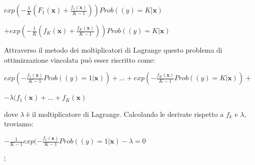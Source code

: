 \begin{center}
 \begin{math}
  exp(-\frac{1}{K}(F_1(\textbf{x}) + \frac{f_1(\textbf{x})}{K-1})) Prob ((y)=K|\textbf{x})
 \end{math}

\end{center}


\begin{center}
 \begin{math}
  + exp(-\frac{1}{K}(f_K(\textbf{x}) + \frac{f_K(\textbf{x})}{K-1})) Prob ((y)=K|\textbf{x})
 \end{math}

\end{center}


Attraverso il metodo dei moltiplicatori di Lagrange questo problema di ottimizzazione vincolata pu\`o 
esser riscritto come:
\begin{center}
 \begin{math}
  exp (-\frac{f_1(\textbf{x})}{K-1} Prob((y)=1|\textbf{x})) + \dots 
+ exp (-\frac{f_K(\textbf{x})}{K-1} Prob((y)=K|\textbf{x})) + 
 \end{math}
\end{center}
\begin{center}
 \begin{math}
-  \lambda (f_1(\textbf{x}) + \dots + f_K(\textbf{x})
 \end{math}

\end{center}
dove \begin{math}
      \lambda 
     \end{math}  \`e il moltiplicatore di Lagrange. Calcolando le derivate rispetto a 
\begin{math}
 f_k
\end{math} e \begin{math}
              \lambda
             \end{math}, troviamo:
\begin{center}
 \begin{math}
  -\frac{1}{K-1} exp (-\frac{f_1(\textbf{x})}{K-1} Prob((y)=1|\textbf{x}) -\lambda = 0
 \end{math}

\end{center}
\begin{center}
 \begin{math}
 \vdots
\end{math}
\end{center}

